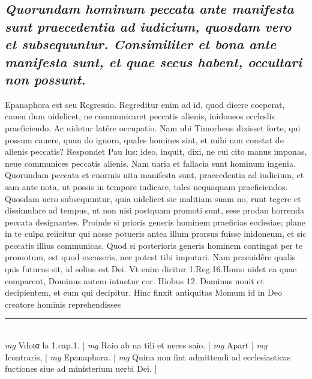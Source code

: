 \documentclass{article}
\begin{document}
\begin{pages}
\subsection*{\textit{Quorundam hominum peccata ante manifesta sunt praecedentia ad iudicium, quosdam vero et subsequuntur. Consimiliter et bona ante manifesta sunt, et quae secus habent, occultari non possunt. }}\pstart Epanaphora est seu Regressio. Regreditur enim ad id, quod dicere coeperat, cauen dum uidelicet, ne communicaret peccatis alienis, inidoneos eccleslis praeficiendo. Ac uidetur latêre occupatio. Nam ubi Timorheus dixisset forte, qui possum cauere, quan do ignoro, quales homines sint, et mihi non constat de alienis peccatis? Respondet Pau lus: ideo, inquit, dixi, ne cui cito manus imponas, neue communices peccatis alienis. Nam uaria et fallacia sunt hominum ingenia. Quorundam peccata et enormis uita manifesta sunt, praecedentia ad iudicium, et sam ante nota, ut possis in tempore iudicare, tales nequaquam praeficiendos. Quosdam uero subsequuntur, quia uidelicet sic malitiam suam no, runt tegere et dissimulare ad tempus, ut non nisi postquam promoti sunt, sese prodan horrenda peccata designantes. Proinde si prioris generis hominem praeficias ecclesiae; plane in te culpa reiicitur qui nosse potueris antea illum prorsus fuisse inidoneum, et sic peccatis illius communicas. Quod si posterioris generis hominem contingat per te promotum, est quod excuseris, nec potest tibi imputari. Nam praeuidêre qualis quis futurus sit, id solius est Dei. Vt enim dicitur 1.Reg.16.Homo uidet ea quae comparent, Dominus autem intuetur cor. Hiobus 12. Dominus nouit et decipientem, et eum qui decipitur. Hinc finxit antiquitas Momum id in Deo creatore hominis reprehendisses  \pend
\vspace{0.5cm}\noindent
\vspace{0.2cm}\rule{1cm}{0.2pt}\\ 
\hspace{0.2cm}\textit{mg}
\footnotesize Vdoια la 1.cap.1. 
\normalsize| 
\hspace{0.2cm}\textit{mg}
\footnotesize Raio ab na tili et neces saio. 
\normalsize| 
\hspace{0.2cm}\textit{mg}
\footnotesize Apart 
\normalsize| 
\hspace{0.2cm}\textit{mg}
\footnotesize Icontraris, 
\normalsize| 
\hspace{0.2cm}\textit{mg}
\footnotesize Epanaphora. 
\normalsize| 
\hspace{0.2cm}\textit{mg}
\footnotesize Quina non fint admittendi ad ecclesiasticas fuctiones siue ad ministerium uerbi Dei. 
\normalsize| 

\end{pages}
\end{document}

